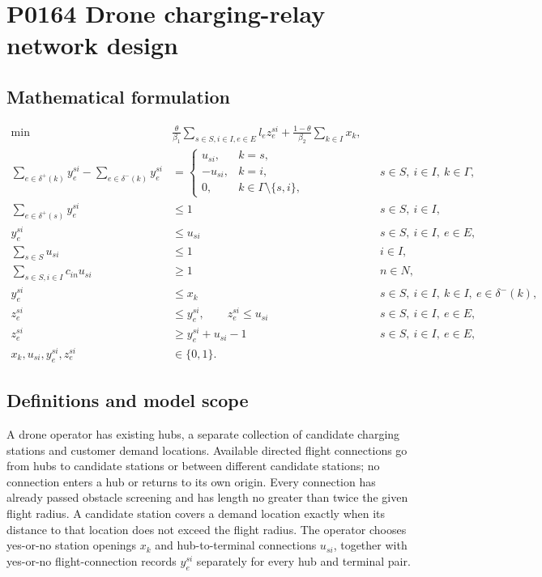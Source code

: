 \documentclass[10pt]{article}
\begin{document}
\section*{P0164 Drone charging-relay network design}
\subsection*{Mathematical formulation}
\begin{align}
\min\quad&
\frac{\theta}{\beta_1}\sum_{s\in S,i\in I,e\in E}l_e z_e^{si}
+\frac{1-\theta}{\beta_2}\sum_{k\in I}x_k,\\
\sum_{e\in\delta^+(k)}y_e^{si}-\sum_{e\in\delta^-(k)}y_e^{si}
&=\begin{cases}u_{si},&k=s,\\-u_{si},&k=i,\\0,&k\in\Gamma\setminus\{s,i\},\end{cases}
&&s\in S,\ i\in I,\ k\in\Gamma,\\
\sum_{e\in\delta^+(s)}y_e^{si}&\le1 &&s\in S,\ i\in I,\\
y_e^{si}&\le u_{si} &&s\in S,\ i\in I,\ e\in E,\\
\sum_{s\in S}u_{si}&\le1 &&i\in I,\\
\sum_{s\in S,i\in I}c_{in}u_{si}&\ge1 &&n\in N,\\
y_e^{si}&\le x_k &&s\in S,\ i\in I,\ k\in I,\ e\in\delta^-(k),\\
z_e^{si}&\le y_e^{si},\qquad z_e^{si}\le u_{si}
&&s\in S,\ i\in I,\ e\in E,\\
z_e^{si}&\ge y_e^{si}+u_{si}-1 &&s\in S,\ i\in I,\ e\in E,\\
x_k,u_{si},y_e^{si},z_e^{si}&\in\{0,1\}. &&
\end{align}

\subsection*{Definitions and model scope}
A drone operator has existing hubs, a separate collection of candidate charging stations and customer demand locations. Available directed flight connections go from hubs to candidate stations or between different candidate stations; no connection enters a hub or returns to its own origin. Every connection has already passed obstacle screening and has length no greater than twice the given flight radius. A candidate station covers a demand location exactly when its distance to that location does not exceed the flight radius. The operator chooses yes-or-no station openings $x_k$ and hub-to-terminal connections $u_{si}$, together with yes-or-no flight-connection records $y_e^{si}$ separately for every hub and terminal pair.
\end{document}
